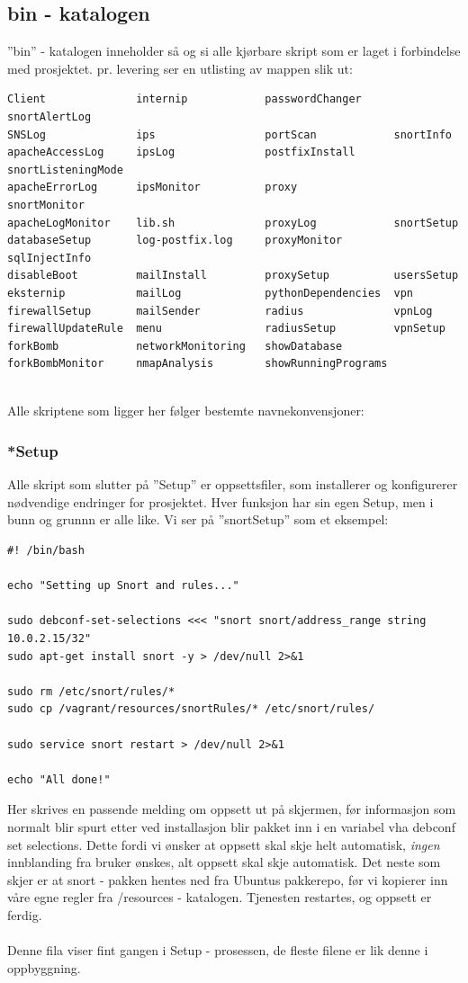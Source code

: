 \documentclass{article}
\begin{document}
\subsection{bin - katalogen}
''bin'' - katalogen inneholder så og si alle kjørbare skript som er laget i forbindelse med prosjektet. pr. levering ser en utlisting av mappen slik ut: 
\begin{lstlisting}
Client              internip            passwordChanger     snortAlertLog
SNSLog              ips                 portScan            snortInfo
apacheAccessLog     ipsLog              postfixInstall      snortListeningMode
apacheErrorLog      ipsMonitor          proxy               snortMonitor
apacheLogMonitor    lib.sh              proxyLog            snortSetup
databaseSetup       log-postfix.log     proxyMonitor        sqlInjectInfo
disableBoot         mailInstall         proxySetup          usersSetup
eksternip           mailLog             pythonDependencies  vpn
firewallSetup       mailSender          radius              vpnLog
firewallUpdateRule  menu                radiusSetup         vpnSetup
forkBomb            networkMonitoring   showDatabase
forkBombMonitor     nmapAnalysis        showRunningPrograms
\end{lstlisting}
\\
Alle skriptene som ligger her følger  bestemte navnekonvensjoner: 
\subsubsection{*Setup}
Alle skript som slutter på ''Setup'' er oppsettsfiler, som installerer og konfigurerer nødvendige endringer for prosjektet. Hver funksjon har sin egen Setup, men i bunn og grunnn er alle like. Vi ser på ''snortSetup'' som et eksempel:  
\begin{lstlisting}
#! /bin/bash

echo "Setting up Snort and rules..."

sudo debconf-set-selections <<< "snort snort/address_range string 10.0.2.15/32"
sudo apt-get install snort -y > /dev/null 2>&1

sudo rm /etc/snort/rules/*
sudo cp /vagrant/resources/snortRules/* /etc/snort/rules/

sudo service snort restart > /dev/null 2>&1

echo "All done!"
\end{lstlisting}
Her skrives en passende melding om oppsett ut på skjermen, før informasjon som normalt blir spurt etter ved installasjon blir pakket inn i en variabel vha
debconf set selections. Dette fordi vi ønsker at oppsett skal skje helt automatisk, \textit{ingen} innblanding fra bruker ønskes, alt oppsett skal skje automatisk. Det neste som skjer er at snort - pakken hentes ned fra Ubuntus pakkerepo, før vi kopierer inn våre egne regler fra /resources - katalogen. 
Tjenesten restartes, og oppsett er ferdig. \\ \\
Denne fila viser fint gangen i Setup - prosessen, de fleste filene er lik denne i oppbyggning.
\end{document}
